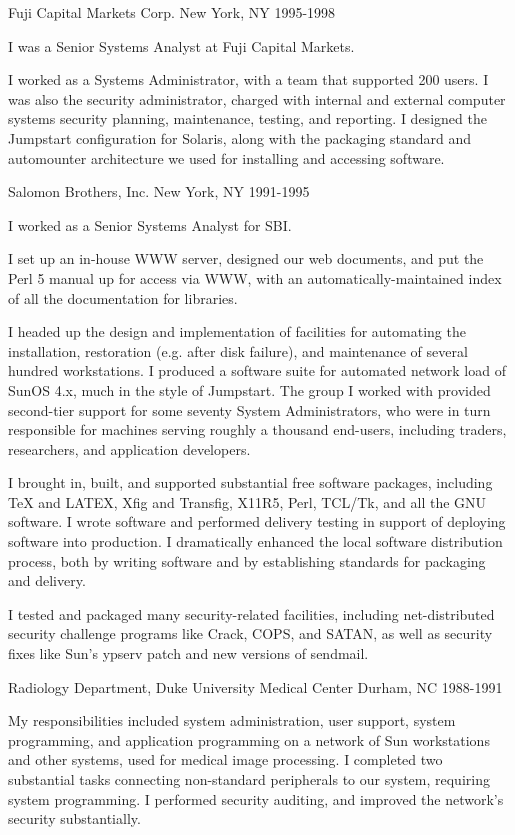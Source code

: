 \documentclass{article}
\begin{document}
Fuji Capital Markets Corp. \hfill New York, NY
1995-1998

I was a Senior Systems Analyst at Fuji Capital Markets.

I worked as a Systems Administrator, with a team that supported
200 users. I was also the security administrator, charged with
internal and external computer systems security planning,
maintenance, testing, and reporting. I designed the Jumpstart
configuration for Solaris, along with the packaging standard and
automounter architecture we used for installing and accessing
software.

Salomon Brothers, Inc. \hfill New York, NY
1991-1995

I worked as a Senior Systems Analyst for SBI.

I set up an in-house WWW server, designed our web documents,
and put the Perl 5 manual up for access via WWW, with an
automatically-maintained index of all the documentation for
libraries.

I headed up the design and implementation of facilities for
automating the installation, restoration (e.g. after disk
failure), and maintenance of several hundred workstations. I
produced a software suite for automated network load of SunOS 4.x,
much in the style of Jumpstart. The group I worked with provided
second-tier support for some seventy System Administrators, who
were in turn responsible for machines serving roughly a thousand
end-users, including traders, researchers, and application
developers.

I brought in, built, and supported substantial free software
packages, including TeX and LATEX, Xfig and Transfig, X11R5,
Perl, TCL/Tk, and all the GNU software. I wrote software and
performed delivery testing in support of deploying software
into production. I dramatically enhanced the local software
distribution process, both by writing software and by establishing
standards for packaging and delivery.

I tested and packaged many security-related facilities, including
net-distributed security challenge programs like Crack, COPS, and
SATAN, as well as security fixes like Sun's ypserv patch and new
versions of sendmail.

Radiology Department, Duke University Medical Center \hfill Durham, NC
1988-1991

My responsibilities included system administration, user
support, system programming, and application programming on a
network of Sun workstations and other systems, used for medical
image processing. I completed two substantial tasks connecting
non-standard peripherals to our system, requiring system
programming. I performed security auditing, and improved the
network's security substantially.
\end{document}
